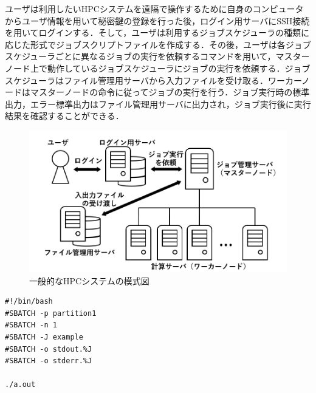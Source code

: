 ユーザは利用したいHPCシステムを遠隔で操作するために自身のコンピュータからユーザ情報を用いて秘密鍵の登録を行った後，ログイン用サーバにSSH接続を用いてログインする．そして，ユーザは利用するジョブスケジューラの種類に応じた形式でジョブスクリプトファイルを作成する．その後，ユーザは各ジョブスケジューラごとに異なるジョブの実行を依頼するコマンドを用いて，マスターノード上で動作しているジョブスケジューラにジョブの実行を依頼する．ジョブスケジューラはファイル管理用サーバから入力ファイルを受け取る．ワーカーノードはマスターノードの命令に従ってジョブの実行を行う．ジョブ実行時の標準出力，エラー標準出力はファイル管理用サーバに出力され，ジョブ実行後に実行結果を確認することができる．\par

\begin{figure}[tb]
    \centering
    \includegraphics[width=120mm]{./fig/HPCsystem.png}
    \caption{一般的なHPCシステムの模式図}
    \label{fig4}
\end{figure}

\begin{lstlisting}[caption=Slurmのジョブスクリプトファイル作成例, label=job_script]
#!/bin/bash
#SBATCH -p partition1
#SBATCH -n 1
#SBATCH -J example
#SBATCH -o stdout.%J
#SBATCH -o stderr.%J
    
./a.out
\end{lstlisting}


